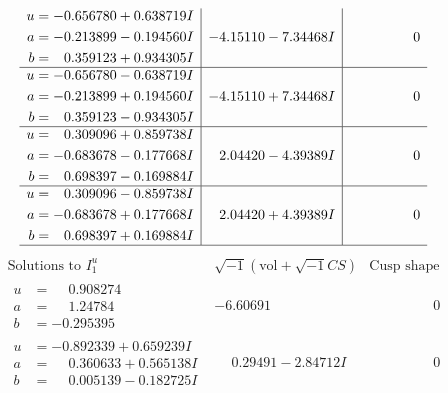 \documentclass[1p]{elsarticle_modified}
\theoremstyle{definition}
\newcommand{\I}{\sqrt{-1}}
\begin{document}
$$\begin{array}{c|c|c}
\begin{aligned}
u &= -0.656780 + 0.638719 I \\
a &= -0.213899 - 0.194560 I \\
b &= \phantom{-}0.359123 + 0.934305 I\end{aligned}
 & -4.15110 - 7.34468 I & \phantom{-0.000000 } 0 \\ \hline\begin{aligned}
u &= -0.656780 - 0.638719 I \\
a &= -0.213899 + 0.194560 I \\
b &= \phantom{-}0.359123 - 0.934305 I\end{aligned}
 & -4.15110 + 7.34468 I & \phantom{-0.000000 } 0 \\ \hline\begin{aligned}
u &= \phantom{-}0.309096 + 0.859738 I \\
a &= -0.683678 - 0.177668 I \\
b &= \phantom{-}0.698397 - 0.169884 I\end{aligned}
 & \phantom{-}2.04420 - 4.39389 I & \phantom{-0.000000 } 0 \\ \hline\begin{aligned}
u &= \phantom{-}0.309096 - 0.859738 I \\
a &= -0.683678 + 0.177668 I \\
b &= \phantom{-}0.698397 + 0.169884 I\end{aligned}
 & \phantom{-}2.04420 + 4.39389 I & \phantom{-0.000000 } 0\\
 \hline 
 \end{array}$$\newpage$$\begin{array}{c|c|c}  
\text{Solutions to }I^u_{1}& \I (\text{vol} + \sqrt{-1}CS) & \text{Cusp shape}\\
 \hline 
\begin{aligned}
u &= \phantom{-}0.908274\phantom{ +0.000000I} \\
a &= \phantom{-}1.24784\phantom{ +0.000000I} \\
b &= -0.295395\phantom{ +0.000000I}\end{aligned}
 & -6.60691\phantom{ +0.000000I} & \phantom{-0.000000 } 0 \\ \hline\begin{aligned}
u &= -0.892339 + 0.659239 I \\
a &= \phantom{-}0.360633 + 0.565138 I \\
b &= \phantom{-}0.005139 - 0.182725 I\end{aligned}
 & \phantom{-}0.29491 - 2.84712 I & \phantom{-0.000000 } 0 \\ \hline\begin{aligned}

\end{aligned}
\end{array}$$
\end{document}
